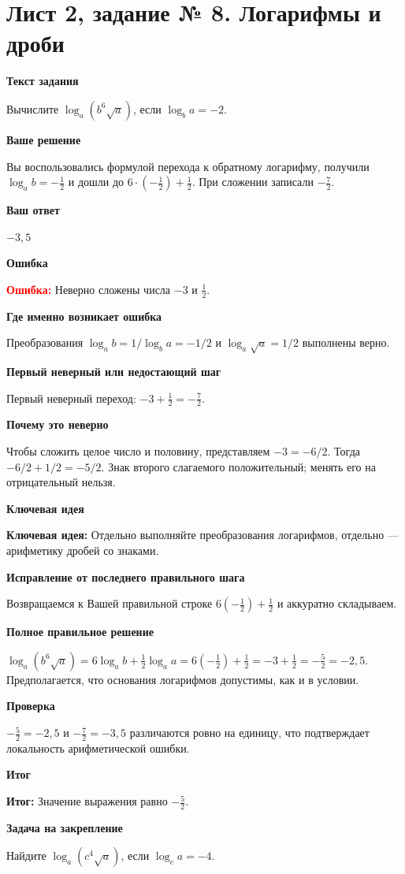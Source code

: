 \documentclass[11pt,a4paper]{article}
\newcommand{\Idea}{\textcolor{blue!60!black}{\textbf{Ключевая идея:}}}
\newcommand{\Res}{\textcolor{teal!60!black}{\textbf{Итог:}}}
\newcommand{\Heading}[2]{\par\medskip\textbf{#1}\par#2\par}
\begin{document}
\section*{Лист 2, задание № 8. Логарифмы и дроби}
\Heading{Текст задания}{Вычислите $\log_a(b^6\sqrt a)$, если $\log_b a=-2$.}
\Heading{Ваше решение}{Вы воспользовались формулой перехода к обратному логарифму, получили $\log_a b=-\frac12$ и дошли до $6\cdot(-\frac12)+\frac12$. При сложении записали $-\frac72$.}
\Heading{Ваш ответ}{$-3{,}5$}
\Heading{Ошибка}{\textcolor{red}{\textbf{Ошибка:}} Неверно сложены числа $-3$ и $\frac12$.}
\Heading{Где именно возникает ошибка}{Преобразования $\log_a b=1/\log_b a=-1/2$ и $\log_a\sqrt a=1/2$ выполнены верно.}
\Heading{Первый неверный или недостающий шаг}{Первый неверный переход: $-3+\frac12=-\frac72$.}
\Heading{Почему это неверно}{Чтобы сложить целое число и половину, представляем $-3=-6/2$. Тогда $-6/2+1/2=-5/2$. Знак второго слагаемого положительный; менять его на отрицательный нельзя.}
\Heading{Ключевая идея}{\Idea{} Отдельно выполняйте преобразования логарифмов, отдельно --- арифметику дробей со знаками.}
\Heading{Исправление от последнего правильного шага}{Возвращаемся к Вашей правильной строке $6(-\frac12)+\frac12$ и аккуратно складываем.}
\Heading{Полное правильное решение}{$\log_a(b^6\sqrt a)=6\log_a b+\frac12\log_a a=6(-\frac12)+\frac12=-3+\frac12=-\frac52=-2{,}5$. Предполагается, что основания логарифмов допустимы, как и в условии.}
\Heading{Проверка}{$-\frac52=-2{,}5$ и $-\frac72=-3{,}5$ различаются ровно на единицу, что подтверждает локальность арифметической ошибки.}
\Heading{Итог}{\Res{} Значение выражения равно $-\frac52$.}
\Heading{Задача на закрепление}{Найдите $\log_a(c^4\sqrt a)$, если $\log_c a=-4$.}
\newpage
{}\label{task:2_9}
\end{document}
